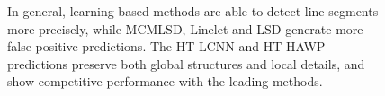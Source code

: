 \documentclass[runningheads]{llncs}
\begin{document}
\begin{figure}
{    In general, learning-based methods are able to detect line segments more precisely, while MCMLSD, Linelet and LSD generate more false-positive predictions. The HT-LCNN and HT-HAWP predictions preserve both global structures and local details, and show competitive performance with the leading methods.
    }
    \label{fig:sup_all_noimg}
\end{figure}




\begin{comment}
\begin{figure}[t!]
    \centering
    \begin{tabular}{ccccc}

        \texttt{[image: figures/000000.pdf]} &
        \texttt{[image: figures/000000\_05.pdf]} &
        \texttt{[image: figures/000000\_025.pdf]} &
        \texttt{[image: figures/000000\_01.pdf]} &
        \texttt{[image: figures/000000\_005.pdf]} \\ 
                \scriptsize{Ground truth} & \scriptsize{L-CNN(50\%)} & \scriptsize{L-CNN(25\%)} 
                & \scriptsize{L-CNN(10\%)} &\scriptsize{L-CNN(5\%)}\\
\texttt{[image: figures/000000\_noimg.pdf]} &
        \texttt{[image: figures/000000\_05\_ht.pdf]} &
        \texttt{[image: figures/000000\_025\_ht.pdf]} &
        \texttt{[image: figures/000000\_01\_ht.pdf]} &
        \texttt{[image: figures/000000\_005\_ht.pdf]} \\ 
                \scriptsize{Ground truth} & \scriptsize{HT-CNN(50\%)} & \scriptsize{HT-CNN(25\%)} 
                & \scriptsize{HT-CNN(10\%)} &\scriptsize{HT-CNN(5\%)}\\


\end{comment}
\end{document}
